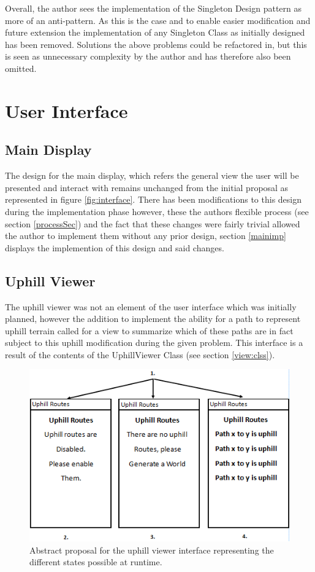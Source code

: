Overall, the author sees the implementation of the Singleton Design pattern as more of an anti-pattern. As this is the case and to enable easier modification and future extension the implementation of any Singleton Class as initially designed has been removed. Solutions the above problems could be refactored in, but this is seen as unnecessary complexity by the author and has therefore also been omitted.

\section{User Interface}

\subsection{Main Display}

The design for the main display, which refers the general view the user will be presented and interact with remains unchanged from the initial proposal as represented in figure \ref{fig:interface}. There has been modifications to this design during the implementation phase however, these the authors flexible process (see section \ref{processSec}) and the fact that these changes were fairly trivial allowed the author to implement them without any prior design, section \ref{mainimp} displays the implemention of this design and said changes.

\subsection{Uphill Viewer}
\label{uphillview}

The uphill viewer was not an element of the user interface which was initially planned, however the addition to implement the ability for a path to represent uphill terrain called for a view to summarize which of these paths are in fact subject to this uphill modification during the given problem. This interface is a result of the contents of the UphillViewer Class (see section \ref{view:clss}).

\begin{figure}[H]
\centering
\includegraphics[scale=0.7]{Images/chapter4/uphilviews}
\caption{Abstract proposal for the uphill viewer interface representing the different states possible at runtime.}
\label{fig:uphillViewImp}
\end{figure}

